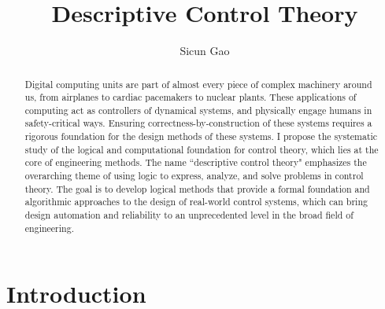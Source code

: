 \documentclass[10pt]{article}
\title{\bf Descriptive Control Theory}
\author{Sicun Gao}
\date{}
\theoremstyle{definition}
\begin{document}
\maketitle
\thispagestyle{empty}
\begin{abstract}
Digital computing units are part of almost every piece of complex machinery around us, from airplanes to cardiac pacemakers to nuclear plants. These applications of computing act as controllers of dynamical systems, and physically engage humans in safety-critical ways. Ensuring correctness-by-construction of these systems requires a rigorous foundation for the design methods of these systems. I propose the systematic study of the logical and computational foundation for control theory, which lies at the core of engineering methods. The name ``descriptive control theory" emphasizes the overarching theme of using logic to express, analyze, and solve problems in control theory. The goal is to develop logical methods that provide a formal foundation and algorithmic approaches to the design of real-world control systems, which can bring design automation and reliability to an unprecedented level in the broad field of engineering. 
\end{abstract}

\vspace{.6cm}

\section{Introduction}
\end{document}
